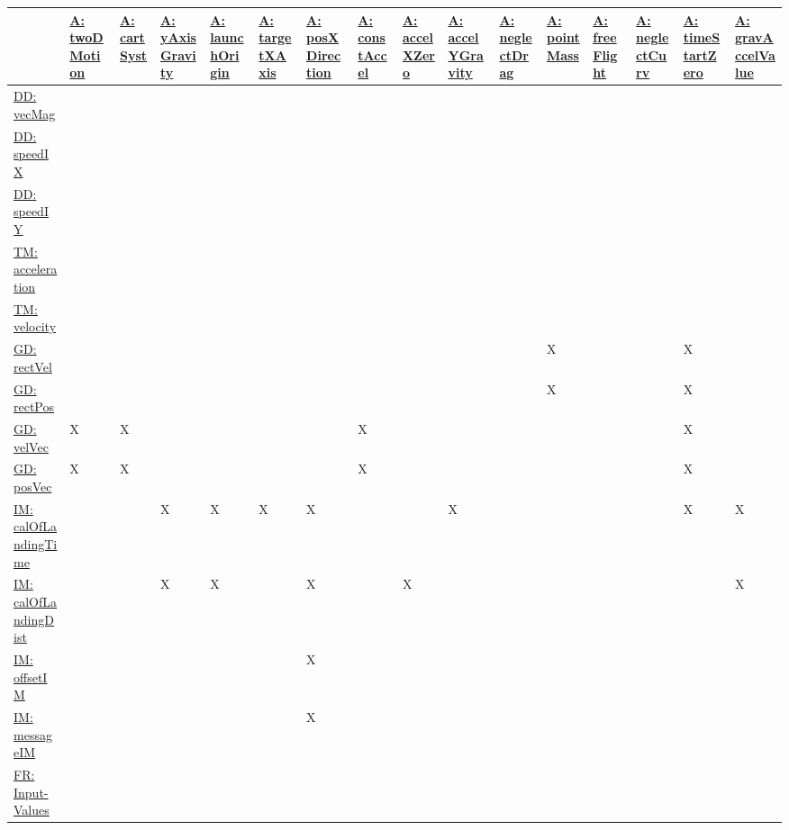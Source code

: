 \documentclass[12pt]{article}
\begin{document}
\begin{longtable}{l l l l l l l l l l l l l l l l}
\toprule
\textbf{} & \textbf{\hyperref[twoDMotion]{A: twoDMotion}} & \textbf{\hyperref[cartSyst]{A: cartSyst}} & \textbf{\hyperref[yAxisGravity]{A: yAxisGravity}} & \textbf{\hyperref[launchOrigin]{A: launchOrigin}} & \textbf{\hyperref[targetXAxis]{A: targetXAxis}} & \textbf{\hyperref[posXDirection]{A: posXDirection}} & \textbf{\hyperref[constAccel]{A: constAccel}} & \textbf{\hyperref[accelXZero]{A: accelXZero}} & \textbf{\hyperref[accelYGravity]{A: accelYGravity}} & \textbf{\hyperref[neglectDrag]{A: neglectDrag}} & \textbf{\hyperref[pointMass]{A: pointMass}} & \textbf{\hyperref[freeFlight]{A: freeFlight}} & \textbf{\hyperref[neglectCurv]{A: neglectCurv}} & \textbf{\hyperref[timeStartZero]{A: timeStartZero}} & \textbf{\hyperref[gravAccelValue]{A: gravAccelValue}}
\\
\midrule
\endhead
\hyperref[DD:vecMag]{DD: vecMag} &  &  &  &  &  &  &  &  &  &  &  &  &  &  & 
\\
\hyperref[DD:speedIX]{DD: speedIX} &  &  &  &  &  &  &  &  &  &  &  &  &  &  & 
\\
\hyperref[DD:speedIY]{DD: speedIY} &  &  &  &  &  &  &  &  &  &  &  &  &  &  & 
\\
\hyperref[TM:acceleration]{TM: acceleration} &  &  &  &  &  &  &  &  &  &  &  &  &  &  & 
\\
\hyperref[TM:velocity]{TM: velocity} &  &  &  &  &  &  &  &  &  &  &  &  &  &  & 
\\
\hyperref[GD:rectVel]{GD: rectVel} &  &  &  &  &  &  &  &  &  &  & X &  &  & X & 
\\
\hyperref[GD:rectPos]{GD: rectPos} &  &  &  &  &  &  &  &  &  &  & X &  &  & X & 
\\
\hyperref[GD:velVec]{GD: velVec} & X & X &  &  &  &  & X &  &  &  &  &  &  & X & 
\\
\hyperref[GD:posVec]{GD: posVec} & X & X &  &  &  &  & X &  &  &  &  &  &  & X & 
\\
\hyperref[IM:calOfLandingTime]{IM: calOfLandingTime} &  &  & X & X & X & X &  &  & X &  &  &  &  & X & X
\\
\hyperref[IM:calOfLandingDist]{IM: calOfLandingDist} &  &  & X & X &  & X &  & X &  &  &  &  &  &  & X
\\
\hyperref[IM:offsetIM]{IM: offsetIM} &  &  &  &  &  & X &  &  &  &  &  &  &  &  & 
\\
\hyperref[IM:messageIM]{IM: messageIM} &  &  &  &  &  & X &  &  &  &  &  &  &  &  & 
\\
\hyperref[inputValues]{FR: Input-Values} &  &  &  &  &  &  &  &  &  &  &  &  &  &  & 

\end{longtable}
\end{document}
